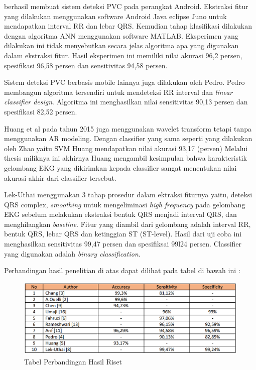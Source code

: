 \cite{Arief2015} berhasil membuat sistem deteksi PVC pada perangkat Android. Ekstraksi fitur yang dilakukan menggunakan software Android Java eclipse Juno untuk mendapatkan interval RR dan lebar QRS. Kemudian tahap klasifikasi dilakukan dengan algoritma ANN menggunakan software MATLAB. Eksperimen yang dilakukan ini tidak menyebutkan secara jelas algoritma apa yang digunakan dalam ekstraksi fitur. Hasil eksperimen ini memiliki nilai akurasi 96,2 persen, 	spesifikasi 96,58 persen dan sensitivitas 94,58 persen.

Sistem deteksi PVC berbasis mobile lainnya juga dilakukan oleh Pedro\cite{Pedro2014}. Pedro membangun algoritma tersendiri untuk mendeteksi RR interval dan \textit{linear classifier design}. Algoritma ini menghasilkan nilai sensitivitas 90,13 persen dan spesifikasi 82,52 persen.

Huang et al \cite{Huang2015Thesis} pada tahun 2015 juga menggunakan wavelet transform tetapi tanpa menggunakan AR modeling. Dengan classifier yang sama seperti yang dilakukan oleh Zhao yaitu SVM Huang mendapatkan nilai akurasi 93,17 (persen) Melalui thesis miliknya ini akhirnya Huang mengambil kesimpulan bahwa karakteristik gelombang EKG yang dikirimkan kepada classifier sangat menentukan nilai akurasi akhir dari classifier tersebut. 

Lek-Uthai \cite{Lekuthai2014} menggunakan 3 tahap prosedur dalam ektraksi fiturnya yaitu, deteksi QRS complex, \textit{smoothing} untuk mengeliminasi \textit{high frequency} pada gelombang EKG sebelum melakukan ekstraksi bentuk QRS menjadi interval QRS, dan menghilangkan \textit{baseline}. Fitur yang diambil dari gelombang adalah interval RR, bentuk QRS, lebar QRS dan ketinggian ST (ST-level). Hasil dari uji coba ini menghasilkan sensitivitas 99,47 persen dan spesifiksai 99l24 persen. Classifier yang digunakan adalah \textit{binary classification}.

Perbandingan hasil penelitian di atas dapat dilihat pada tabel di bawah ini : 
\begin{figure}[h!]
	\centering
	\includegraphics[scale=0.5]{comparison-tab.png}
	\caption{Tabel Perbandingan Hasil Riset}
	\label{fig:my_auth}
\end{figure}
